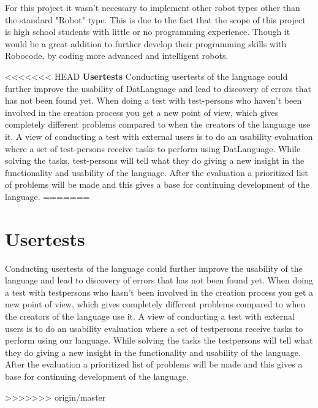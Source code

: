 For this project it wasn't necessary to implement other robot types other than the standard "Robot" type. This is due to the fact that the scope of this project is high school students with little or no programming experience. Though it would be a great addition to further develop their programming skills with Robocode, by coding more advanced and intelligent robots.

<<<<<<< HEAD
\textbf{\LARGE{Usertests}}
Conducting usertests of the language could further improve the usability of DatLanguage and lead to discovery of errors that has not been found yet. When doing a test with test-persons who haven't been involved in the creation process you get a new point of view, which gives completely different problems compared to when the creators of the language use it. 
A view of conducting a test with external users is to do an usability evaluation where a set of test-persons receive tasks to perform using DatLanguage. While solving the tasks, test-persons will tell what they do giving a new insight in the functionality and usability of the language. 
After the evaluation a prioritized list of problems will be made and this gives a base for continuing development of the language. 
=======
\section{Usertests}
Conducting usertests of the language could further improve the usability of the language and lead to discovery of errors that has not been found yet. When doing a test with testpersons who hasn't been involved in the creation process you get a new point of view, which gives completely different problems compared to when the creators of the language use it. 
A view of conducting a test with external users is to do an usability evaluation where a set of testpersons receive tasks to perform using our language. While solving the tasks the testpersons will tell what they do giving a new insight in the functionality and usability of the language. 
After the evaluation a prioritized list of problems will be made and this gives a base for continuing development of the language. 

>>>>>>> origin/master
